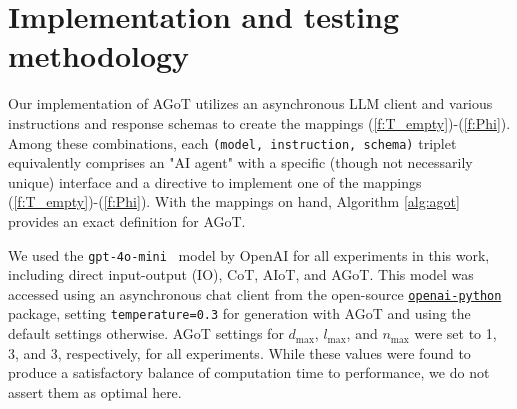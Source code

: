 \documentclass{article}
\begin{document}

\section{Implementation and testing methodology} \label{sec:implementation}
Our implementation of AGoT utilizes an asynchronous LLM client and various instructions and response schemas to create the mappings (\ref{f:T_empty})-(\ref{f:Phi}). Among these combinations, each \texttt{(model,~instruction,~schema)} triplet equivalently comprises an "AI agent" with a specific (though not necessarily unique) interface and a directive to implement one of the mappings (\ref{f:T_empty})-(\ref{f:Phi}). With the mappings on hand, Algorithm \ref{alg:agot} provides an exact definition for AGoT.

We used the \texttt{gpt-4o-mini}~\citep{hurst2024gpt} model by OpenAI for all experiments in this work, including direct input-output (IO), CoT, AIoT, and AGoT. This model was accessed using an asynchronous chat client from the open-source \href{https://github.com/openai/openai-python}{\texttt{openai-python}} package, setting \texttt{temperature=0.3} for generation with AGoT and using the default settings otherwise. AGoT settings for $d_\text{max}$, $l_\text{max}$, and $n_\text{max}$ were set to 1, 3, and 3, respectively, for all experiments. While these values were found to produce a satisfactory balance of computation time to performance, we do not assert them as optimal here.
\end{document}
